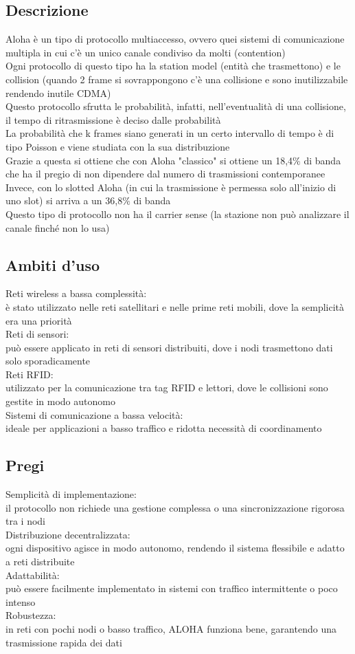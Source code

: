 \documentclass[10pt,oneside,a4paper]{article}
\begin{document}
\subsection{Descrizione}
Aloha è un tipo di protocollo multiaccesso, ovvero quei sistemi di comunicazione multipla in cui c'è un unico canale condiviso da molti (contention)\\
Ogni protocollo di questo tipo ha la station model (entità che trasmettono) e le collision (quando 2 frame si sovrappongono c'è una collisione e sono inutilizzabile rendendo inutile CDMA)\\
Questo protocollo sfrutta le probabilità, infatti, nell'eventualità di una collisione, il tempo di ritrasmissione è deciso dalle probabilità\\
La probabilità che k frames siano generati in un certo intervallo di tempo è di tipo Poisson e viene studiata con la sua distribuzione\\
Grazie a questa si ottiene che con Aloha "classico" si ottiene un 18,4$\%$ di banda che ha il pregio di non dipendere dal numero di trasmissioni contemporanee\\
Invece, con lo slotted Aloha (in cui la trasmissione è permessa solo all'inizio di uno slot) si arriva a un 36,8$\%$ di banda\\
Questo tipo di protocollo non ha il carrier sense (la stazione non può analizzare il canale finché non lo usa)
\subsection{Ambiti d'uso}
Reti wireless a bassa complessità:\\
è stato utilizzato nelle reti satellitari e nelle prime reti mobili, dove la semplicità era una priorità\\
Reti di sensori:\\
può essere applicato in reti di sensori distribuiti, dove i nodi trasmettono dati solo sporadicamente\\
Reti RFID:\\
utilizzato per la comunicazione tra tag RFID e lettori, dove le collisioni sono gestite in modo autonomo\\
Sistemi di comunicazione a bassa velocità:\\
ideale per applicazioni a basso traffico e ridotta necessità di coordinamento
\subsection{Pregi}
Semplicità di implementazione:\\
il protocollo non richiede una gestione complessa o una sincronizzazione rigorosa tra i nodi\\
Distribuzione decentralizzata:\\
ogni dispositivo agisce in modo autonomo, rendendo il sistema flessibile e adatto a reti distribuite\\
Adattabilità:\\
può essere facilmente implementato in sistemi con traffico intermittente o poco intenso\\
Robustezza:\\
in reti con pochi nodi o basso traffico, ALOHA funziona bene, garantendo una trasmissione rapida dei dati
\end{document}
